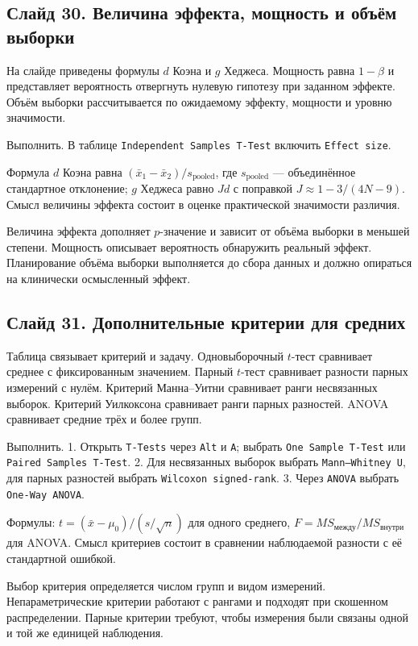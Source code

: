 \documentclass[11pt,a4paper]{article}
\begin{document}
\subsection*{Слайд 30. Величина эффекта, мощность и объём выборки}
\begin{onslide}
На слайде приведены формулы $d$ Коэна и $g$ Хеджеса. Мощность равна $1-\beta$ и представляет вероятность отвергнуть нулевую гипотезу при заданном эффекте. Объём выборки рассчитывается по ожидаемому эффекту, мощности и уровню значимости.
\end{onslide}
\begin{jamovi}
Выполнить. В таблице \texttt{Independent Samples T-Test} включить \texttt{Effect size}.\par Формула $d$ Коэна равна $(\bar{x}_1-\bar{x}_2)/s_{\text{pooled}}$, где $s_{\text{pooled}}$ — объединённое стандартное отклонение; $g$ Хеджеса равно $J d$ с поправкой $J\approx1-3/(4N-9)$. Смысл величины эффекта состоит в оценке практической значимости различия.
\end{jamovi}
Величина эффекта дополняет $p$-значение и зависит от объёма выборки в меньшей степени. Мощность описывает вероятность обнаружить реальный эффект. Планирование объёма выборки выполняется до сбора данных и должно опираться на клинически осмысленный эффект.

\subsection*{Слайд 31. Дополнительные критерии для средних}
\begin{onslide}
Таблица связывает критерий и задачу. Одновыборочный $t$-тест сравнивает среднее с фиксированным значением. Парный $t$-тест сравнивает разности парных измерений с нулём. Критерий Манна--Уитни сравнивает ранги несвязанных выборок. Критерий Уилкоксона сравнивает ранги парных разностей. ANOVA сравнивает средние трёх и более групп.
\end{onslide}
\begin{jamovi}
Выполнить. 1. Открыть \texttt{T-Tests} через \texttt{Alt} и \texttt{A}; выбрать \texttt{One Sample T-Test} или \texttt{Paired Samples T-Test}. 2. Для несвязанных выборок выбрать \texttt{Mann--Whitney U}, для парных разностей выбрать \texttt{Wilcoxon signed-rank}. 3. Через \texttt{ANOVA} выбрать \texttt{One-Way ANOVA}.\par Формулы: $t=(\bar{x}-\mu_0)/(s/\sqrt{n})$ для одного среднего, $F=MS_{\text{между}}/MS_{\text{внутри}}$ для ANOVA. Смысл критериев состоит в сравнении наблюдаемой разности с её стандартной ошибкой.
\end{jamovi}
Выбор критерия определяется числом групп и видом измерений. Непараметрические критерии работают с рангами и подходят при скошенном распределении. Парные критерии требуют, чтобы измерения были связаны одной и той же единицей наблюдения.
\end{document}
